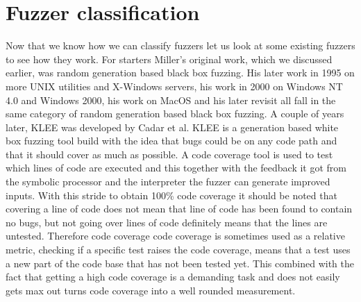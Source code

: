 \section{Fuzzer classification}
\label{cha:2:OtherFuzzers}
Now that we know how we can classify fuzzers let us look at some existing fuzzers to see how they work. For starters Miller's original work, which we discussed earlier, was random generation based black box fuzzing. His later work in 1995 on more UNIX utilities and X-Windows servers\cite{26miller1995fuzzrevisited}, his work in 2000 on Windows NT 4.0 and Windows 2000\cite{24MillerWindows}, his work on MacOS\cite{25MillerOnMacOS} and his later revisit\cite{3miller2020relevanceOfClasicalFuzzTesting} all fall in the same category of random generation based black box fuzzing.
A couple of years later, KLEE\cite{8KLEE} was developed by Cadar et al. KLEE is a generation based white box fuzzing tool build with the idea that bugs could be on any code path and that it should cover as much as possible. A code coverage tool is used to test which lines of code are executed and this together with the feedback it got from the symbolic processor and the interpreter the fuzzer can generate improved inputs. With this stride to obtain 100\% code coverage it should be noted that covering a line of code does not mean that line of code has been found to contain no bugs, but not going over lines of code definitely means that the lines are untested. Therefore code coverage code coverage is sometimes used as a relative metric, checking if a specific test raises the code coverage, means that a test uses a new part of the code base that has not been tested yet. This combined with the fact that getting a high code coverage is a demanding task and does not easily gets max out turns code coverage into a well rounded measurement.

